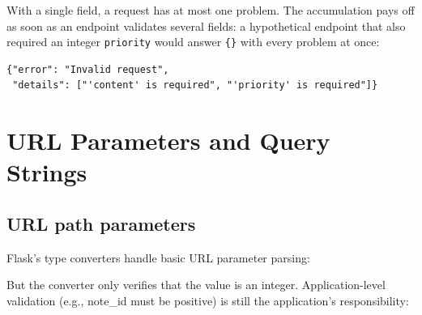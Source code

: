 \noindent{}With a single field, a request has at most one problem. The accumulation pays off as soon as an endpoint validates several fields: a hypothetical endpoint that also required an integer \texttt{priority} would answer \texttt{\{\}} with every problem at once:

\begin{outputbox}[short]
\begin{Verbatim}[fontsize=\codesize, breaklines, breakanywhere, breaksymbolleft={\tiny\textcolor{muted}{$\hookrightarrow$}}]
{"error": "Invalid request",
 "details": ["'content' is required", "'priority' is required"]}
\end{Verbatim}
\end{outputbox}

\setcounter{section}{3}
\section{URL Parameters and Query Strings}\label{31-input-handling:314-url-parameters-and-query-strings}

\subsection*{URL path parameters}\label{31-input-handling:url-path-parameters}

Flask's type converters handle basic URL parameter parsing:

\begin{codebox}[short]

\begin{Shaded}
\begin{Highlighting}[]
\NormalTok{(}\OperatorTok{=}\NormalTok{[}\NormalTok{])}
\end{Highlighting}
\end{Shaded}

\end{codebox}

\noindent{}But the converter only verifies that the value is an integer. Application-level validation (e.g., note\_id must be positive) is still the application's responsibility:

